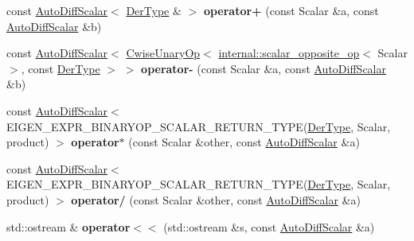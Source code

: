 \begin{DoxyCompactItemize}
const \hyperlink{class_eigen_1_1_auto_diff_scalar}{Auto\+Diff\+Scalar}$<$ \hyperlink{group___sparse_core___module}{Der\+Type} \& $>$ {\bfseries operator+} (const Scalar \&a, const \hyperlink{class_eigen_1_1_auto_diff_scalar}{Auto\+Diff\+Scalar} \&b)
\item 
\mbox{\label{class_eigen_1_1_auto_diff_scalar_a64be15e08f3db2e24a97f3eaabc7160b}} 
const \hyperlink{class_eigen_1_1_auto_diff_scalar}{Auto\+Diff\+Scalar}$<$ \hyperlink{group___core___module_class_eigen_1_1_cwise_unary_op}{Cwise\+Unary\+Op}$<$ \hyperlink{struct_eigen_1_1internal_1_1scalar__opposite__op}{internal\+::scalar\+\_\+opposite\+\_\+op}$<$ Scalar $>$, const \hyperlink{group___sparse_core___module}{Der\+Type} $>$ $>$ {\bfseries operator-\/} (const Scalar \&a, const \hyperlink{class_eigen_1_1_auto_diff_scalar}{Auto\+Diff\+Scalar} \&b)
\item 
\mbox{\label{class_eigen_1_1_auto_diff_scalar_aa2a5676cdfe4e7a3649da0784d971993}} 
const \hyperlink{class_eigen_1_1_auto_diff_scalar}{Auto\+Diff\+Scalar}$<$ E\+I\+G\+E\+N\+\_\+\+E\+X\+P\+R\+\_\+\+B\+I\+N\+A\+R\+Y\+O\+P\+\_\+\+S\+C\+A\+L\+A\+R\+\_\+\+R\+E\+T\+U\+R\+N\+\_\+\+T\+Y\+PE(\hyperlink{group___sparse_core___module}{Der\+Type}, Scalar, product) $>$ {\bfseries operator$\ast$} (const Scalar \&other, const \hyperlink{class_eigen_1_1_auto_diff_scalar}{Auto\+Diff\+Scalar} \&a)
\item 
\mbox{\label{class_eigen_1_1_auto_diff_scalar_a70599a82a101b28f383653884f52c21e}} 
const \hyperlink{class_eigen_1_1_auto_diff_scalar}{Auto\+Diff\+Scalar}$<$ E\+I\+G\+E\+N\+\_\+\+E\+X\+P\+R\+\_\+\+B\+I\+N\+A\+R\+Y\+O\+P\+\_\+\+S\+C\+A\+L\+A\+R\+\_\+\+R\+E\+T\+U\+R\+N\+\_\+\+T\+Y\+PE(\hyperlink{group___sparse_core___module}{Der\+Type}, Scalar, product) $>$ {\bfseries operator/} (const Scalar \&other, const \hyperlink{class_eigen_1_1_auto_diff_scalar}{Auto\+Diff\+Scalar} \&a)
\item 
\mbox{\label{class_eigen_1_1_auto_diff_scalar_aaa3efe607e0e4cac21c7ccb1d0f5f800}} 
std\+::ostream \& {\bfseries operator$<$$<$} (std\+::ostream \&s, const \hyperlink{class_eigen_1_1_auto_diff_scalar}{Auto\+Diff\+Scalar} \&a)
\item 
\mbox{\label{class_eigen_1_1_auto_diff_scalar_a7f329201c1c6671fa0bd1aaa1be0e30b}} 

\end{DoxyCompactItemize}
